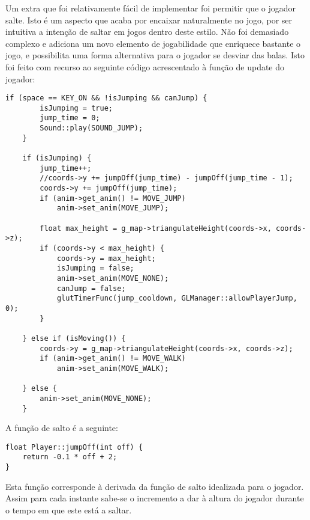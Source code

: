 Um extra que foi relativamente fácil de implementar foi permitir que o jogador salte. Isto é um aspecto que acaba por encaixar naturalmente no jogo, por ser intuitiva a intenção de saltar em jogos dentro deste estilo. Não foi demasiado complexo e adiciona um novo elemento de jogabilidade que enriquece bastante o jogo, e possibilita uma forma alternativa para o jogador se desviar das balas.
Isto foi feito com recurso ao seguinte código acrescentado à função de update do jogador:

\begin{lstlisting}
if (space == KEY_ON && !isJumping && canJump) {
		isJumping = true;
		jump_time = 0;
		Sound::play(SOUND_JUMP);
	}

	if (isJumping) {
		jump_time++;
		//coords->y += jumpOff(jump_time) - jumpOff(jump_time - 1);
		coords->y += jumpOff(jump_time);
		if (anim->get_anim() != MOVE_JUMP)
			anim->set_anim(MOVE_JUMP);

		float max_height = g_map->triangulateHeight(coords->x, coords->z);
		if (coords->y < max_height) {
			coords->y = max_height;
			isJumping = false;
			anim->set_anim(MOVE_NONE);
			canJump = false;
			glutTimerFunc(jump_cooldown, GLManager::allowPlayerJump, 0);
		}

	} else if (isMoving()) {
		coords->y = g_map->triangulateHeight(coords->x, coords->z);
		if (anim->get_anim() != MOVE_WALK)
			anim->set_anim(MOVE_WALK);

	} else {
		anim->set_anim(MOVE_NONE);
	}
\end{lstlisting}

A função de salto é a seguinte:

\begin{lstlisting}
float Player::jumpOff(int off) {
	return -0.1 * off + 2;
}
\end{lstlisting}

Esta função corresponde à derivada da função de salto idealizada para o jogador. Assim para cada instante sabe-se o incremento a dar à altura do jogador durante o tempo em que este está a saltar.
